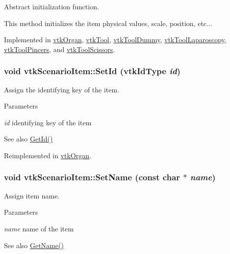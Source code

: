 Abstract initialization function. 

This method initializes the item physical values, scale, position, etc... 

Implemented in \hyperlink{classvtkOrgan_a48aa20d7255903b3f7ac5cd2a4adec8c}{vtkOrgan}, \hyperlink{classvtkTool_a6b9e7743cde1b61b252abef17248a913}{vtkTool}, \hyperlink{classvtkToolDummy_aaf4c69a9c0fc3432e678ca9fffc913dc}{vtkToolDummy}, \hyperlink{classvtkToolLaparoscopy_ace75ea21a3ddb27547976ddea0ebb60e}{vtkToolLaparoscopy}, \hyperlink{classvtkToolPincers_ae4918610073324c94dddd8da234742a9}{vtkToolPincers}, and \hyperlink{classvtkToolScissors_a5fc5884ce0fd1723ecf86888bdbba7a6}{vtkToolScissors}.

\hypertarget{classvtkScenarioItem_afd99a6db7187837d0129e9898478ec60}{
\subsubsection[{SetId}]{\setlength{\rightskip}{0pt plus 5cm}void vtkScenarioItem::SetId (vtkIdType {\em id})}}
\label{classvtkScenarioItem_afd99a6db7187837d0129e9898478ec60}


Assign the identifying key of the item. 


\begin{DoxyParams}{Parameters}
\item[{\em id}]identifying key of the item \end{DoxyParams}
\begin{DoxySeeAlso}{See also}
\hyperlink{classvtkScenarioItem_a9884061bd42ee058291d95a67ddcac20}{GetId()} 
\end{DoxySeeAlso}


Reimplemented in \hyperlink{classvtkOrgan_a0aab831b4e0a9d33ba961a0907b73e80}{vtkOrgan}.

\hypertarget{classvtkScenarioItem_a199f87511e99386bb9f271d91c2d0caf}{
\subsubsection[{SetName}]{\setlength{\rightskip}{0pt plus 5cm}void vtkScenarioItem::SetName (const char $\ast$ {\em name})}}
\label{classvtkScenarioItem_a199f87511e99386bb9f271d91c2d0caf}


Assign item name. 


\begin{DoxyParams}{Parameters}
\item[{\em name}]name of the item \end{DoxyParams}
\begin{DoxySeeAlso}{See also}
\hyperlink{classvtkScenarioItem_a41ebb204b2879d9dd14a392c1cb3c2fe}{GetName()} 
\end{DoxySeeAlso}


